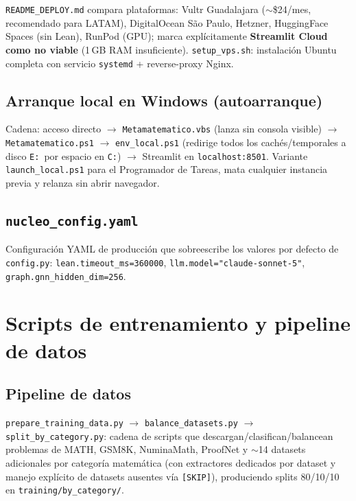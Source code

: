 \documentclass[11pt,a4paper]{report}
\newcommand{\code}[1]{\texttt{#1}}
\begin{document}
\code{README_DEPLOY.md} compara plataformas: Vultr Guadalajara ($\sim$\$24/mes, recomendado para LATAM), DigitalOcean S\~ao Paulo, Hetzner, HuggingFace Spaces (sin Lean), RunPod (GPU); marca expl\'icitamente \textbf{Streamlit Cloud como no viable} (1\,GB RAM insuficiente). \code{setup_vps.sh}: instalaci\'on Ubuntu completa con servicio \code{systemd} + reverse-proxy Nginx.

\section{Arranque local en Windows (autoarranque)}

Cadena: acceso directo $\to$ \code{Metamatematico.vbs} (lanza sin consola visible) $\to$ \code{Metamatematico.ps1} $\to$ \code{env_local.ps1} (redirige todos los cach\'es/temporales a disco \code{E:}\ por espacio en \code{C:}) $\to$ Streamlit en \code{localhost:8501}. Variante \code{launch_local.ps1} para el Programador de Tareas, mata cualquier instancia previa y relanza sin abrir navegador.

\section{\code{nucleo_config.yaml}}

Configuraci\'on YAML de producci\'on que sobreescribe los valores por defecto de \code{config.py}: \code{lean.timeout_ms=360000}, \code{llm.model="claude-sonnet-5"}, \code{graph.gnn_hidden_dim=256}.

\chapter{Scripts de entrenamiento y pipeline de datos}

\section{Pipeline de datos}

\code{prepare_training_data.py} $\to$ \code{balance_datasets.py} $\to$ \code{split_by_category.py}: cadena de scripts que descargan/clasifican/balancean problemas de MATH, GSM8K, NuminaMath, ProofNet y $\sim$14 datasets adicionales por categor\'ia matem\'atica (con extractores dedicados por dataset y manejo expl\'icito de datasets ausentes v\'ia \code{[SKIP]}), produciendo splits 80/10/10 en \code{training/by_category/}.
\end{document}
